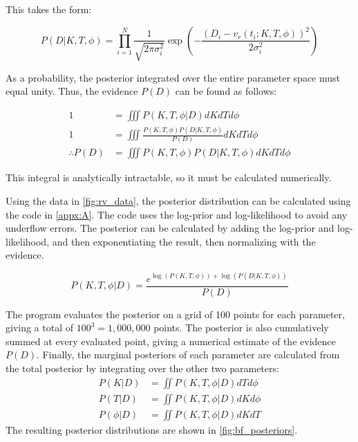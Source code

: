 \documentclass[preprint,longauthor]{aastex631}
\numberwithin{equation}{section}
\begin{document}
This takes the form:

\begin{equation}
  P(D|K,T,\phi) = \prod_{i=1}^{N} \frac{1}{\sqrt{2\pi\sigma_i^2}} \exp\left(-\frac{(D_i - v_r(t_i;K,T,\phi))^2}{2\sigma_i^2}\right)
\end{equation}

As a probability, the posterior integrated over the entire parameter space must equal unity. Thus, the evidence $P(D)$ can be found as follows:

\begin{align}
  1 &= \iiint P(K,T,\phi|D) dK dT d\phi\nonumber \\
  1 &= \iiint \frac{P(K,T,\phi)P(D|K,T,\phi)}{P(D)} dK dT d\phi \nonumber \\
  \therefore P(D) &= \iiint P(K,T,\phi)P(D|K,T,\phi) dK dT d\phi
\end{align}

This integral is analytically intractable, so it must be calculated numerically.

Using the data in \autoref{fig:rv_data}, the posterior distribution can be calculated using the code in \autoref{appx:A}. The code uses the log-prior and log-likelihood to avoid any underflow errors. The posterior can be calculated by adding the log-prior and log-likelihood, and then exponentiating the result, then normalizing with the evidence.

\begin{equation}
  P(K,T,\phi|D) = \frac{e^{\log(P(K,T,\phi)) + \log(P(D|K,T,\phi))}}{P(D)}
\end{equation}

The program evaluates the posterior on a grid of 100 points for each parameter, giving a total of $100^3 = 1,000,000$ points. The posterior is also cumulatively summed at every evaluated point, giving a numerical estimate of the evidence $P(D)$. Finally, the marginal posteriors of each parameter are calculated from the total posterior by integrating over the other two parameters:
\begin{align}
  P(K|D) &= \iint P(K,T,\phi|D) dT d\phi \\
  P(T|D) &= \iint P(K,T,\phi|D) dK d\phi \\
  P(\phi|D) &= \iint P(K,T,\phi|D) dK dT
\end{align}
The resulting posterior distributions are shown in \autoref{fig:bf_posteriors}.
\end{document}
